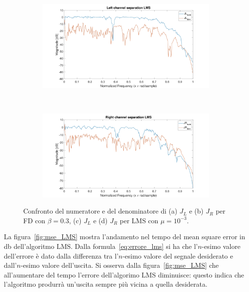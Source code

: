 \documentclass[12pt,a4paper,titlepage]{article}
\begin{document}
\begin{figure}[h]
	\ContinuedFloat
	\centering	
	\begin{subfigure}{1\textwidth}
		\includegraphics[width=1\textwidth]{Immagini/left_channel_separation_LMS}
		\caption{}
		\label{left_channel_separation_LMS}
	\end{subfigure}\\
	\begin{subfigure}{1\textwidth}
		\includegraphics[width=1\textwidth]{Immagini/right_channel_separation_LMS}
		\caption{}
		\label{right_channel_separation_LMS}
	\end{subfigure}
	\caption{Confronto del numeratore e del denominatore di (a) $J_L$ e (b) $J_R$ per FD con $\beta = 0.3$, (c) $J_L$ e (d) $J_R$ per LMS con $\mu = 10^{-3}$.}
	\label{fig:channel_separation_LMS_FD}
\end{figure}

La figura~\ref{fig:mse_LMS} mostra l'andamento nel tempo del mean square error in \si{\decibel} dell'algoritmo LMS. Dalla formula~\eqref{eq:errore_lms} si ha che l'$n$-esimo valore dell'errore è dato dalla differenza tra l'$n$-esimo valore del segnale desiderato e dall'$n$-esimo valore dell'uscita. Si osserva dalla figura~\ref{fig:mse_LMS} che all'aumentare del tempo l'errore dell'algorimo LMS diminuisce: questo indica che l'algoritmo produrrà un'uscita sempre più vicina a quella desiderata. 
\end{document}
